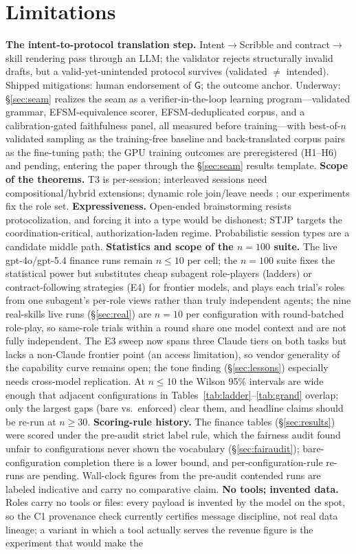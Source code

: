 \documentclass{article}
\newcommand{\gtG}{\mathsf{G}}
\newcommand{\stjp}{\textsc{STJP}}
\begin{document}
\section{Limitations}\label{sec:limits}
\textbf{The intent-to-protocol translation step.} Intent$\to$Scribble and contract$\to$skill rendering pass through an LLM; the validator rejects structurally invalid drafts, but a valid-yet-unintended protocol survives (validated $\neq$ intended). Shipped mitigations: human endorsement of $\gtG$; the outcome anchor. Underway: \S\ref{sec:seam} realizes the seam as a verifier-in-the-loop learning program---validated grammar, EFSM-equivalence scorer, EFSM-deduplicated corpus, and a calibration-gated faithfulness panel, all measured before training---with best-of-$n$ validated sampling as the training-free baseline and back-translated corpus pairs as the fine-tuning path; the GPU training outcomes are preregistered (H1--H6) and pending, entering the paper through the \S\ref{sec:seam} results template. \textbf{Scope of the theorems.} T3 is per-session; interleaved sessions need compositional/hybrid extensions; dynamic role join/leave needs \citep{denielou11}; our experiments fix the role set. \textbf{Expressiveness.} Open-ended brainstorming resists protocolization, and forcing it into a type would be dishonest; \stjp{} targets the coordination-critical, authorization-laden regime. Probabilistic session types are a candidate middle path. \textbf{Statistics and scope of the $n{=}100$ suite.} The live gpt-4o/gpt-5.4 finance runs remain $n\leq10$ per cell; the $n{=}100$ suite fixes the statistical power but substitutes cheap subagent role-players (ladders) or contract-following strategies (E4) for frontier models, and plays each trial's roles from one subagent's per-role views rather than truly independent agents; the nine real-skills live runs (\S\ref{sec:real}) are $n{=}10$ per configuration with round-batched role-play, so same-role trials within a round share one model context and are not fully independent. The E3 sweep now spans three Claude tiers on both tasks but lacks a non-Claude frontier point (an access limitation), so vendor generality of the capability curve remains open; the tone finding (\S\ref{sec:lessons}) especially needs cross-model replication. At $n{\leq}10$ the Wilson 95\% intervals are wide enough that adjacent configurations in Tables~\ref{tab:ladder}--\ref{tab:grand} overlap; only the largest gaps (bare vs.\ enforced) clear them, and headline claims should be re-run at $n{\geq}30$. \textbf{Scoring-rule history.} The finance tables (\S\ref{sec:results}) were scored under the pre-audit strict label rule, which the fairness audit found unfair to configurations never shown the vocabulary (\S\ref{sec:fairaudit}); bare-configuration completion there is a lower bound, and per-configuration-rule re-runs are pending. Wall-clock figures from the pre-audit contended runs are labeled indicative and carry no comparative claim. \textbf{No tools; invented data.} Roles carry no tools or files: every payload is invented by the model on the spot, so the C1 provenance check currently certifies message discipline, not real data lineage; a variant in which a tool actually serves the revenue figure is the experiment that would make the 
\end{document}
